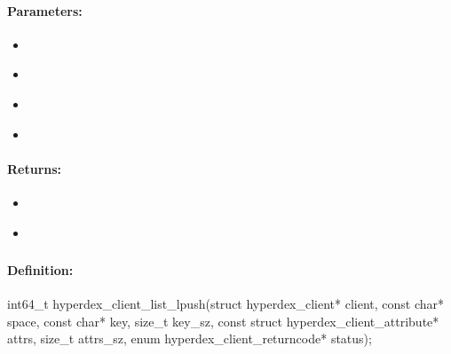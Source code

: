\paragraph{Parameters:}
\begin{itemize}[noitemsep]
\item {}\\

\item {}\\

\item {}\\

\item {}\\

\end{itemize}

\paragraph{Returns:}
\begin{itemize}[noitemsep]
\item {}\\

\item {}\\

\end{itemize}

\pagebreak
\subsubsection{}
\label{api:c:list_lpush}


\paragraph{Definition:}
\begin{ccode}
int64_t hyperdex_client_list_lpush(struct hyperdex_client* client,
        const char* space,
        const char* key, size_t key_sz,
        const struct hyperdex_client_attribute* attrs, size_t attrs_sz,
        enum hyperdex_client_returncode* status);
\end{ccode}

